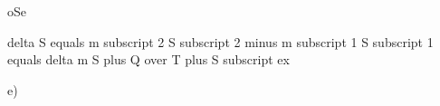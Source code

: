 oSe

delta S equals m subscript 2 S subscript 2 minus m subscript 1 S subscript 1 equals delta m S plus Q over T plus S subscript ex

e)